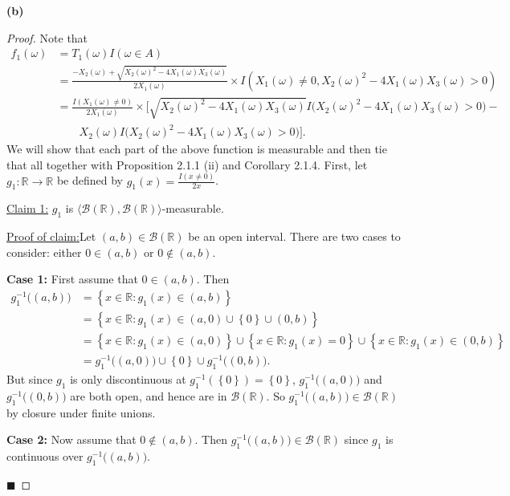 \documentclass[12pt]{article}
\newenvironment{claimproof}[1]{\par\noindent\underline{Proof of claim:}\space#1}{\hfill $\blacksquare$}
\begin{document}
{\bf (b)} 
\begin{proof}
Note that 
\begin{align*}
f_{1}(\omega) & = T_{1}(\omega)I(\omega \in A) \\
& = \frac{-X_{2}(\omega) + \sqrt{X_{2}(\omega)^{2} - 4X_{1}(\omega)X_{3}(\omega)}}{2X_{1}(\omega)}\times I(X_{1}(\omega)\neq 0, X_{2}(\omega)^{2} -
4X_{1}(\omega)X_{3}(\omega) > 0) \\
& = \frac{I(X_{1}(\omega) \neq 0)}{2X_{1}(\omega)} \times \bigg[ \sqrt{X_{2}(\omega)^{2} - 4X_{1}(\omega)X_{3}(\omega)}I\big(X_{2}(\omega)^{2} -
4X_{1}(\omega)X_{3}(\omega) > 0\big) - \\
& \qquad X_{2}(\omega)I\big(X_{2}(\omega)^{2} - 4X_{1}(\omega)X_{3}(\omega) > 0\big) \bigg].
\end{align*}
We will show that each part of the above function is measurable and then tie that all together with Proposition 2.1.1 (ii) and Corollary 2.1.4. First,
let $g_{1} : \mathbb{R} \rightarrow \mathbb{R}$ be defined by $g_{1}(x) = \frac{I(x \neq 0)}{2x}$.

\underline{Claim 1:} $g_{1}$ is $\langle\mathcal{B}(\mathbb{R}), \mathcal{B}(\mathbb{R})\rangle$-measurable.

\begin{claimproof}
Let $(a,b) \in \mathcal{B}(\mathbb{R})$ be an open interval. There are two cases to consider: either $0 \in (a,b)$ or $0 \notin (a,b)$.

{\bf Case 1:} First assume that $0 \in (a,b)$. Then 
\begin{align*}
g_{1}^{-1}\big( (a,b) \big) & = \left\{ x \in \mathbb{R} : g_{1}(x) \in (a,b) \right\} \\
& = \left\{ x \in \mathbb{R} : g_{1}(x) \in (a,0) \cup \left\{ 0 \right\} \cup (0, b) \right\} \\
& = \left\{ x \in \mathbb{R} : g_{1}(x) \in (a,0) \right\} \cup \left\{ x \in \mathbb{R} : g_{1}(x) = 0 \right\} \cup \left\{ x \in \mathbb{R} :
g_{1}(x) \in (0,b) \right\} \\
& = g_{1}^{-1}\big( (a,0) \big) \cup \left\{ 0 \right\} \cup g_{1}^{-1}\big( (0,b) \big).
\end{align*}
But since $g_{1}$ is only discontinuous at $g_{1}^{-1}(\left\{ 0 \right\}) = \left\{ 0 \right\}$, $g_{1}^{-1}\big( (a,0)\big)$ and $g_{1}^{-1}\big(
(0,b)\big)$ are both open, and hence are in $\mathcal{B}(\mathbb{R})$. So $g_{1}^{-1}\big( (a,b)\big) \in \mathcal{B}(\mathbb{R})$ by closure under
finite unions.

{\bf Case 2:} Now assume that $0 \notin (a,b)$. Then $g_{1}^{-1}\big( (a,b) \big) \in \mathcal{B}(\mathbb{R})$ since $g_{1}$ is continuous over
$g_{1}^{-1}\big( (a,b)\big)$.


\end{claimproof}
\end{proof}
\end{document}
